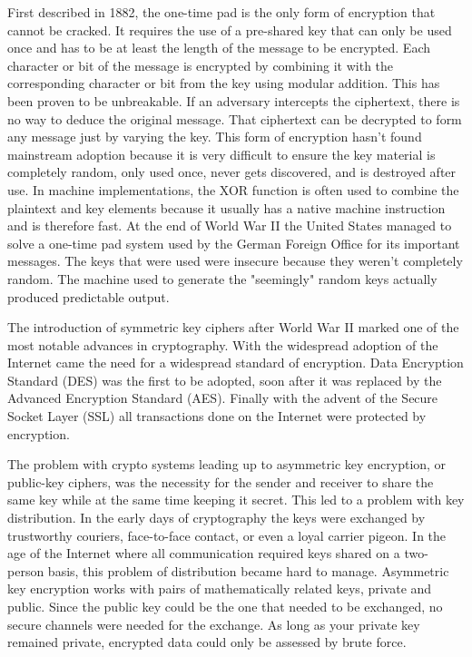 \documentclass[journal]{IEEEtran}
\begin{document}
First described in 1882, the one-time pad is the only form of encryption that cannot be cracked.  It requires the use of a pre-shared key that can only be used once and has to be at least the length of the message to be encrypted.  Each character or bit of the message is encrypted by combining it with the corresponding character or bit from the key using modular addition.  This has been proven to be unbreakable.  If an adversary intercepts the ciphertext, there is no way to deduce the original message.  That ciphertext can be decrypted to form any message just by varying the key.  This form of encryption hasn't found mainstream adoption because it is very difficult to ensure the key material is completely random, only used once, never gets discovered, and is destroyed after use.  In machine implementations, the XOR function is often used to combine the plaintext and key elements because it usually has a native machine instruction and is therefore fast.  At the end of World War II the United States managed to solve a one-time pad system used by the German Foreign Office for its important messages.  The keys that were used were insecure because they weren't completely random.  The machine used to generate the "seemingly" random keys actually produced predictable output.


The introduction of symmetric key ciphers after World War II marked one of the most notable advances in cryptography.  With the widespread adoption of the Internet came the need for a widespread standard of encryption.  Data Encryption Standard (DES) was the first to be adopted, soon after it was replaced by the Advanced Encryption Standard (AES).  Finally with the advent of the Secure Socket Layer (SSL) all transactions done on the Internet were protected by encryption.


The problem with crypto systems leading up to asymmetric key encryption, or public-key ciphers, was the necessity for the sender and receiver to share the same key while at the same time keeping it secret.  This led to a problem with key distribution.  In the early days of cryptography the keys were exchanged by trustworthy couriers, face-to-face contact, or even a loyal carrier pigeon.  In the age of the Internet where all communication required keys shared on a two-person basis, this problem of distribution became hard to manage.  Asymmetric key encryption works with pairs of mathematically related keys, private and public.  Since the public key could be the one that needed to be exchanged, no secure channels were needed for the exchange.  As long as your private key remained private, encrypted data could only be assessed by brute force.
\end{document}
